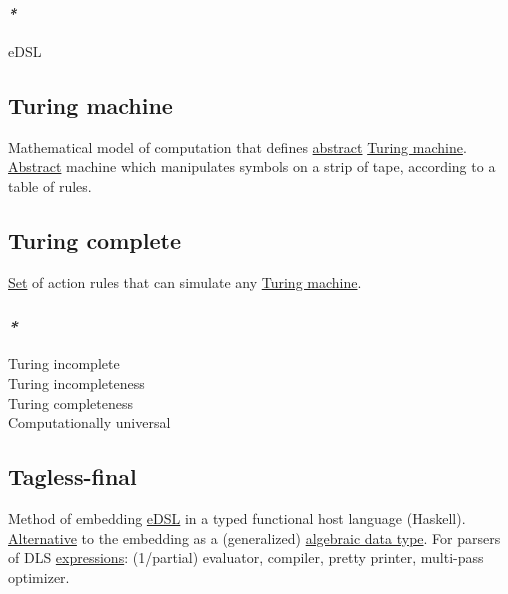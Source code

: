 \documentclass[11pt]{article}
\begin{document}
\paragraph{\emph{*}}
\label{sec:org73048f2}

\label{org0776fb4}eDSL\\

\subsection{\label{org2238f80}Turing machine}
\label{sec:org44d4fad}
Mathematical model of computation that defines \hyperref[orgbbe9132]{abstract} \hyperref[org2238f80]{Turing machine}. \hyperref[orgbbe9132]{Abstract} machine which manipulates symbols on a strip of tape, according to a table of rules.\\

\subsection{\label{orge184335}Turing complete}
\label{sec:org22fcef5}

\hyperref[org1faf06d]{Set} of action rules that can simulate any \hyperref[org2238f80]{Turing machine}.\\

\subsubsection{\emph{*}}
\label{sec:org8bd902f}

\label{org9dc3717}Turing incomplete\\
\label{orgcd044a3}Turing incompleteness\\
\label{orgea33e28}Turing completeness\\
\label{org95beea2}Computationally universal\\

\subsection{\label{org0f6c05c}Tagless-final}
\label{sec:org0fc36c8}
Method of embedding \hyperref[org0776fb4]{eDSL} in a typed functional host language (Haskell). \hyperref[orgabbc1e9]{Alternative} to the embedding as a (generalized) \hyperref[org2278a14]{algebraic data type}. For parsers of DLS \hyperref[org3731c99]{expressions}: (1/partial) evaluator, compiler, pretty printer, multi-pass optimizer.\\
\end{document}
